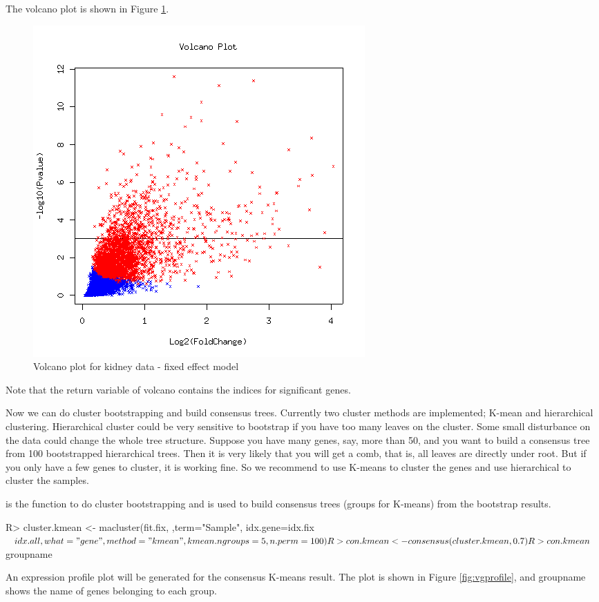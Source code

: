 The volcano plot is shown in Figure \ref{fig:volcano}.
\begin{figure}[htbp]
\centering
\includegraphics{volcano.png}
\caption{Volcano plot for kidney data - fixed effect model}
\label{fig:volcano}
\end{figure}
Note that the return variable of volcano contains the indices
for significant genes.

Now we can do cluster bootstrapping and build consensus trees.
Currently two cluster methods are implemented; K-mean and hierarchical clustering. Hierarchical cluster could be very sensitive to bootstrap
if you have too many leaves on the cluster. 
Some small disturbance on the data could change the whole tree structure. 
Suppose you have many genes, say, more than 50, and you want to build a
consensus tree from 100 bootstrapped hierarchical trees. Then it is very
likely that you will get a comb, that is, all leaves are directly under 
root. But if you only have a few genes to cluster, it is working fine. 
So we recommend to use K-means to cluster the genes and use hierarchical
to cluster the samples. 

 is the function to 
do cluster bootstrapping and 
is used to build consensus trees (groups for K-means) from the 
bootstrap results.
\begin{Sinput}
R> cluster.kmean <- macluster(fit.fix, ,term="Sample",
      idx.gene=idx.fix$idx.all,what="gene", method="kmean",
      kmean.ngroups=5, n.perm=100)
R> con.kmean <- consensus(cluster.kmean, 0.7)
R> con.kmean$groupname
\end{Sinput}
An expression profile plot will be generated for the consensus K-means
result. The plot is shown in Figure \ref{fig:vgprofile}, and groupname shows
the name of genes belonging to each group.


